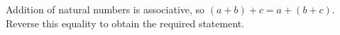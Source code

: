 Addition of natural numbers is associative, so $(a+b)+c=a+(b+c)$. Reverse this equality to obtain the required statement.
